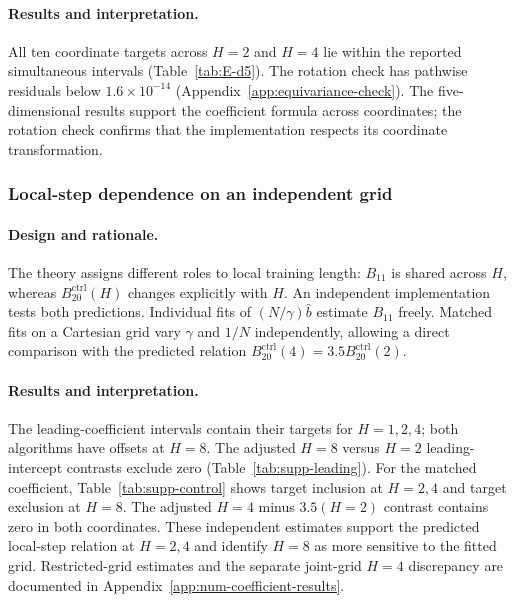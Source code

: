 \paragraph{Results and interpretation.}
All ten coordinate targets across $H=2$ and $H=4$ lie within the reported
simultaneous intervals (Table~\ref{tab:E-d5}). The rotation check has
pathwise residuals below $1.6\times10^{-14}$
(Appendix~\ref{app:equivariance-check}). The five-dimensional results
support the coefficient formula across coordinates; the rotation check
confirms that the implementation respects its coordinate transformation.

\subsubsection{Local-step dependence on an independent grid}
\label{sec:num-supp-theory}

\paragraph{Design and rationale.}
The theory assigns different roles to local training length: $B_{11}$ is
shared across $H$, whereas $B_{20}^{\mathrm{ctrl}}(H)$ changes explicitly
with $H$. An independent implementation tests both predictions. Individual
fits of $(N/\gamma)\widehat b$ estimate $B_{11}$ freely. Matched fits on
a Cartesian grid vary $\gamma$ and $1/N$ independently, allowing a direct
comparison with the predicted relation
$B_{20}^{\mathrm{ctrl}}(4)=3.5B_{20}^{\mathrm{ctrl}}(2)$.

\paragraph{Results and interpretation.}
The leading-coefficient intervals contain their targets for $H=1,2,4$;
both algorithms have offsets at $H=8$. The adjusted \Scaf{} $H=8$
versus $H=2$ leading-intercept contrasts exclude zero
(Table~\ref{tab:supp-leading}). For the matched coefficient,
Table~\ref{tab:supp-control} shows target inclusion at $H=2,4$ and target
exclusion at $H=8$. The adjusted $H=4$ minus $3.5(H=2)$ contrast contains
zero in both coordinates. These independent estimates support the predicted
local-step relation at $H=2,4$ and identify $H=8$ as more sensitive to the
fitted grid. Restricted-grid estimates and the separate joint-grid
$H=4$ discrepancy are documented in
Appendix~\ref{app:num-coefficient-results}.

